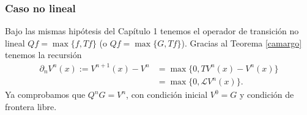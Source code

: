 \documentclass{article}
\numberwithin{equation}{section}
\begin{document}
\subsubsection{Caso no lineal}

Bajo las mismas hipótesis del Capítulo 1 tenemos el operador de transición no lineal $Qf = \max\{f,Tf\}$ (o $Qf = \max\{G,Tf\}$). Gracias al Teorema \ref{camargo} tenemos la recursión 
\begin{align}
    \partial_nV^n(x) := V^{n+1}(x) - V^{n} &= \max\{0,TV^{n}(x) - V^{n}(x)\}\\ &= \max\{0,\mathcal{L}V^{n}(x)\}.
\end{align}
Ya comprobamos que $Q^nG = V^n$, con condición inicial $V^0 = G$ y condición de frontera libre.


 
\end{document}
